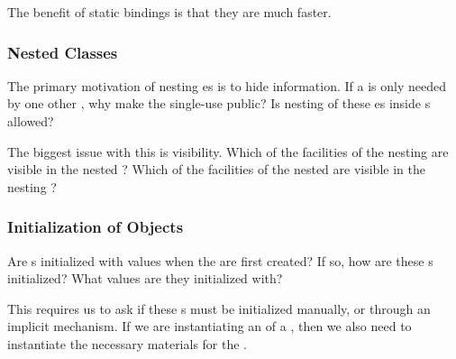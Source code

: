 The benefit of static bindings is that they are much faster.

\subsubsection{Nested Classes}\label{subsubsec:OOP_Nested_Classes}
The primary motivation of nesting es is to hide information.
If a  is only needed by one other , why make the single-use  public?
Is nesting of these es inside s allowed?

The biggest issue with this is visibility.
Which of the facilities of the nesting  are visible in the nested ?
Which of the facilities of the nested  are visible in the nesting ?

\subsubsection{Initialization of Objects}\label{subsubsec:OOP_Object_Initialization}
Are s initialized with values when the are first created?
If so, how are these s initialized?
What values are they initialized with?

This requires us to ask if these s must be initialized manually, or through an implicit mechanism.
If we are instantiating an  of a , then we also need to instantiate the necessary materials for the .

